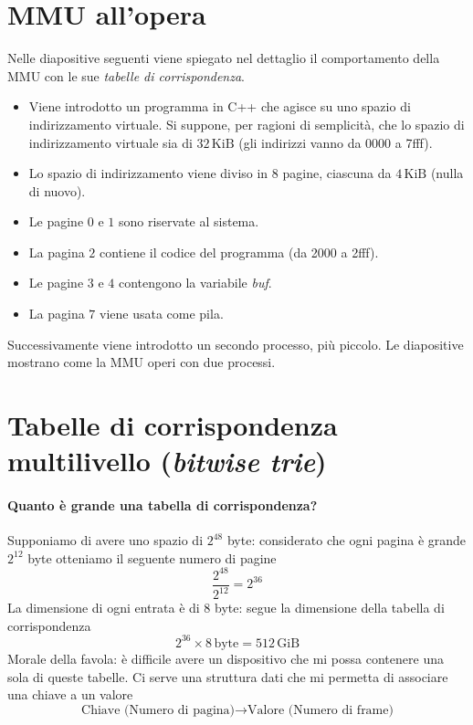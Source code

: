 \documentclass[11pt]{report}
\theoremstyle{definition}
\begin{document}
\section{MMU all'opera}
\small
Nelle diapositive seguenti viene spiegato nel dettaglio il comportamento della MMU con le sue \emph{tabelle di corrispondenza}. 
\begin{itemize}
	\item Viene introdotto un programma in C++ che agisce su uno spazio di indirizzamento virtuale. Si suppone, per ragioni di semplicità, che lo spazio di indirizzamento virtuale sia di $32\,\text{KiB}$ (gli indirizzi vanno da 0000 a 7fff).
	\item Lo spazio di indirizzamento viene diviso in 8 pagine, ciascuna da $4\,\text{KiB}$ (nulla di nuovo).
	\item Le pagine $0$ e $1$ sono riservate al sistema.
	\item La pagina $2$ contiene il codice del programma (da 2000 a 2fff).
	\item Le pagine $3$ e $4$ contengono la variabile \emph{buf}.
	\item La pagina $7$ viene usata come pila.
\end{itemize}
Successivamente viene introdotto un secondo processo, più piccolo. Le diapositive mostrano come la MMU operi con due processi.
\normalsize 



\section{Tabelle di corrispondenza multilivello (\emph{bitwise trie})}
\paragraph{Quanto è grande una tabella di corrispondenza?} Supponiamo di avere uno spazio di $2^{48}$ byte: considerato che ogni pagina è grande $2^{12}$ byte otteniamo il seguente numero di pagine
\[\frac{2^{48}}{2^{12}}=2^{36}\]
La dimensione di ogni entrata è di 8 byte: segue la dimensione della tabella di corrispondenza
\[2^{36} \times 8\,\text{byte}=512\,\text{GiB}\]
Morale della favola: è difficile avere un dispositivo che mi possa contenere una sola di queste tabelle. Ci serve una struttura dati che mi permetta di associare una chiave a un valore
\[\boxed{\text{Chiave (Numero di pagina)} \longrightarrow \text{Valore (Numero di frame)}}\]
\end{document}
